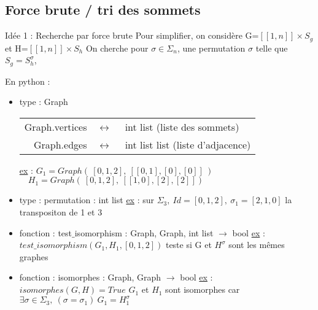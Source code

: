\subsection{Force brute / tri des sommets}
\begin{frame}[fragile]{Idée 1 : Recherche par force brute}
\footnotesize
Pour simplifier, on considère G=$[\![ 1,n]\!]\times S_g$ et H=$[\![ 1,n]\!]\times S_h$ 
\newline\newline On cherche pour $\sigma \in \Sigma_n$, une permutation $\sigma$ telle que $S_g=S_h^\sigma$,

En python : 

\begin{itemize}
    \item type : \textcolor{charcoal}{Graph}
        \begin{tabular}{rl}
            \textcolor{airforceblue}{Graph.vertices} & $\longleftrightarrow \quad$ int list (liste des sommets) \\ 
            \textcolor{airforceblue}{Graph.edges} & $\longleftrightarrow \quad$ int list list (liste d'adjacence)
        \end{tabular}
        \newline\underline{ex} : $G_1 = Graph(\ [0,1,2],\ [[0,1], [0], [0]]\ )$
        \newline $\quad H_1 = Graph(\ [0,1,2],\ [[1,0], [2], [2]] )$
    \item type : permutation : int list
        \newline \underline{ex} : sur $\Sigma_3,\ Id = [0,1,2],\ \sigma_1=[2,1,0]$ la transpositon de 1 et 3
    \item fonction : \textcolor{airforceblue}{test$\_$isomorphism} : Graph, Graph, int list $\longrightarrow$ bool
        \newline \underline{ex} : $test\_isomorphism( G_1, H_1 , [0,1,2])$
        \newline teste si G et $H^{\sigma}$ sont les mêmes graphes
    \item fonction : \textcolor{airforceblue}{isomorphes} : Graph, Graph $\longrightarrow$ bool
        \newline \underline{ex} : $isomorphes(G, H) = True$
        \newline $G_1$ et $H_1$ sont isomorphes car $\exists \sigma \in \Sigma_3,\ (\sigma=\sigma_1)\ G_1=H_1^{\sigma}$
\end{itemize}
\end{frame}

